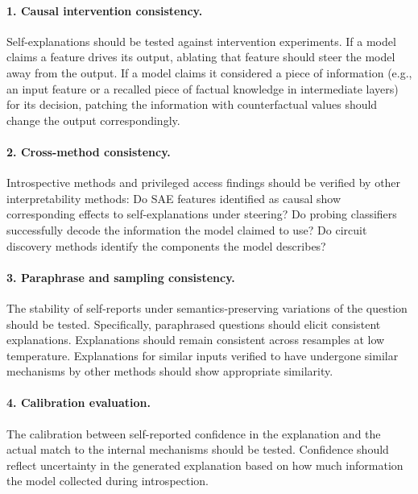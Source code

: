 \begin{practicebox}
\paragraph{1. Causal intervention consistency.} Self-explanations should be tested against intervention experiments. If a model claims a feature drives its output, ablating that feature should steer the model away from the output. If a model claims it considered a piece of information (e.g., an input feature or a recalled piece of factual knowledge in intermediate layers) for its decision, patching the information with counterfactual values should change the output correspondingly.\\

\paragraph{2. Cross-method consistency.} Introspective methods and privileged access findings should be verified by other interpretability methods: Do SAE features identified as causal show corresponding effects to self-explanations under steering? Do probing classifiers successfully decode the information the model claimed to use? Do circuit discovery methods identify the components the model describes?\\

\paragraph{3. Paraphrase and sampling consistency.} The stability of self-reports under semantics-preserving variations of the question should be tested. Specifically, paraphrased questions should elicit consistent explanations. Explanations should remain consistent across resamples at low temperature. Explanations for similar inputs verified to have undergone similar mechanisms by other methods should show appropriate similarity.\\

\paragraph{4. Calibration evaluation.} The calibration between self-reported confidence in the explanation and the actual match to the internal mechanisms should be tested. Confidence should reflect uncertainty in the generated explanation based on how much information the model collected during introspection.

\end{practicebox}











